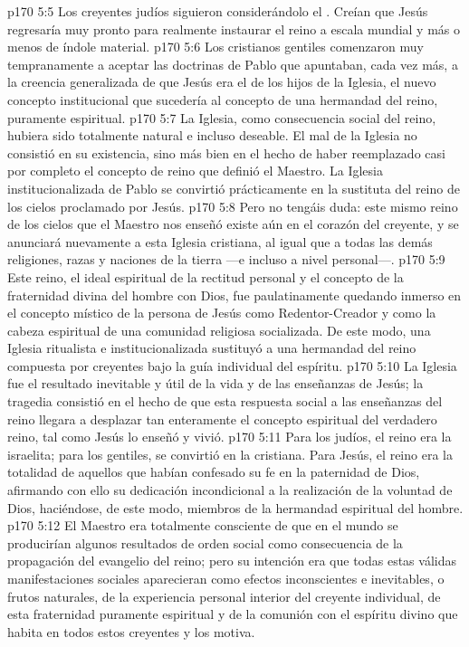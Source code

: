 \vs p170 5:5 Los creyentes judíos siguieron considerándolo el . Creían que Jesús regresaría muy pronto para realmente instaurar el reino a escala mundial y más o menos de índole material.
\vs p170 5:6 Los cristianos gentiles comenzaron muy tempranamente a aceptar las doctrinas de Pablo que apuntaban, cada vez más, a la creencia generalizada de que Jesús era el  de los hijos de la Iglesia, el nuevo concepto institucional que sucedería al concepto de una hermandad del reino, puramente espiritual.
\vs p170 5:7 \pc La Iglesia, como consecuencia social del reino, hubiera sido totalmente natural e incluso deseable. El mal de la Iglesia no consistió en su existencia, sino más bien en el hecho de haber reemplazado casi por completo el concepto de reino que definió el Maestro. La Iglesia institucionalizada de Pablo se convirtió prácticamente en la sustituta del reino de los cielos proclamado por Jesús.
\vs p170 5:8 Pero no tengáis duda: este mismo reino de los cielos que el Maestro nos enseñó existe aún en el corazón del creyente, y se anunciará nuevamente a esta Iglesia cristiana, al igual que a todas las demás religiones, razas y naciones de la tierra ---e incluso a nivel personal---.
\vs p170 5:9 Este reino, el ideal espiritual de la rectitud personal y el concepto de la fraternidad divina del hombre con Dios, fue paulatinamente quedando inmerso en el concepto místico de la persona de Jesús como Redentor\hyp{}Creador y como la cabeza espiritual de una comunidad religiosa socializada. De este modo, una Iglesia ritualista e institucionalizada sustituyó a una hermandad del reino compuesta por creyentes bajo la guía individual del espíritu.
\vs p170 5:10 La Iglesia fue el resultado  inevitable y útil de la vida y de las enseñanzas de Jesús; la tragedia consistió en el hecho de que esta respuesta social a las enseñanzas del reino llegara a desplazar tan enteramente el concepto espiritual del verdadero reino, tal como Jesús lo enseñó y vivió.
\vs p170 5:11 Para los judíos, el reino era la  israelita; para los gentiles, se convirtió en la  cristiana. Para Jesús, el reino era la totalidad de aquellos que  habían confesado su fe en la paternidad de Dios, afirmando con ello su dedicación incondicional a la realización de la voluntad de Dios, haciéndose, de este modo, miembros de la hermandad espiritual del hombre.
\vs p170 5:12 El Maestro era totalmente consciente de que en el mundo se producirían algunos resultados de orden social como consecuencia de la propagación del evangelio del reino; pero su intención era que todas estas válidas manifestaciones sociales aparecieran como efectos inconscientes e inevitables, o frutos naturales, de la experiencia personal interior del creyente individual, de esta fraternidad puramente espiritual y de la comunión con el espíritu divino que habita en todos estos creyentes y los motiva.

